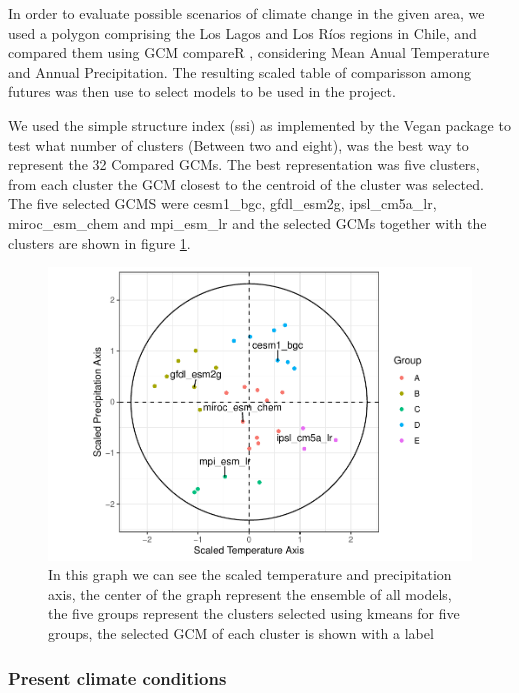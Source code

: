 \documentclass[]{article}
\begin{document}
In order to evaluate possible scenarios of climate change in the given area, we used a polygon comprising the Los Lagos and Los Ríos regions in Chile, and compared them using GCM compareR \citep{fajardo2020gcm}, considering Mean Anual Temperature and Annual Precipitation. The resulting scaled table of comparisson among futures was then use to select models to be used in the project.

We used the simple structure index (ssi) as implemented by the Vegan package \citep{Oksanen_2019, dolnicar1999tale} to test what number of clusters (Between two and eight), was the best way to represent the 32 Compared GCMs. The best representation was five clusters, from each cluster the GCM closest to the centroid of the cluster was selected. The five selected GCMS were cesm1\_bgc, gfdl\_esm2g, ipsl\_cm5a\_lr, miroc\_esm\_chem and mpi\_esm\_lr and the selected GCMs together with the clusters are shown in figure \ref{fig:SelectedGCMs}.

\begin{figure}
\centering
\includegraphics{Review_and_climate_files/figure-latex/SelectedGCMs-1.pdf}
\caption{\label{fig:SelectedGCMs}In this graph we can see the scaled temperature and precipitation axis, the center of the graph represent the ensemble of all models, the five groups represent the clusters selected using kmeans for five groups, the selected GCM of each cluster is shown with a label}
\end{figure}

\hypertarget{present-climate-conditions}{%
\subsubsection{Present climate conditions}\label{present-climate-conditions}}
\end{document}
